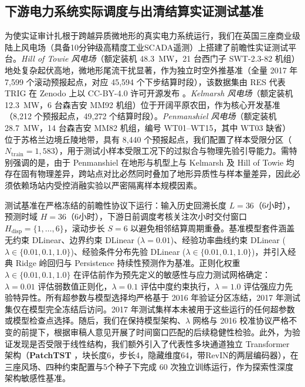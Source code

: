 \subsection{下游电力系统实际调度与出清结算实证测试基准}
为使实证审计扎根于跨越异质微地形的真实电力系统运行，我们在英国三座商业级陆上风电场（具备10分钟级高精度工业SCADA遥测）上搭建了前瞻性实证测试平台。\textit{Hill of Towie 风电场}（额定装机 48.3~MW，21 台西门子 SWT-2.3-82 机组）地处复杂起伏高地，微地形尾流干扰显著，作为独立时空外推基准（全量 2017 年 7,599 个滚动预报起点，对应 45,594 个下步结算时段），该数据集由 RES 代表 TRIG 在 Zenodo 上以 CC-BY-4.0 许可开源发布 \cite{zenodo_hilloftowie}。\textit{Kelmarsh 风电场}（额定装机 12.3~MW，6 台森吉安 MM92 机组）位于开阔平原农田，作为核心开发基准（8,212 个预报起点，49,272 个结算时段）\cite{zenodo_kelmarsh}。\textit{Penmanshiel 风电场}（额定装机 28.7~MW，14 台森吉安 MM82 机组，编号 WT01--WT15，其中 WT03 缺省）\cite{zenodo_penmanshiel} 位于苏格兰边境丘陵地带，具有 8,440 个预报起点，我们配置了样本受限分区（$N_{\text{train}} = 1,583$），用于测试小样本受限工况下的过拟合与物理先验引导能力。需特别强调的是，由于 Penmanshiel 在地形与机型上与 Kelmarsh 及 Hill of Towie 均存在固有物理差异，跨站点对比必然同时叠加了地形异质性与样本量差异，因此必须依赖场站内受控消融实验以严密隔离样本规模因素。

测试基准在严格冻结的前瞻性协议下运行：输入历史回溯长度 $L=36$（6小时），预测时域 $H=36$（6小时），下游日前调度考核关注次小时交付窗口 $H_{\text{disp}} = \{1, \dots, 6\}$，滚动步长 $S=6$ 以避免相邻结算周期重叠。基准模型套件涵盖无约束 DLinear、边界约束 DLinear ($\lambda=0.01$)、经验功率曲线约束 DLinear ($\lambda \in \{0.01, 0.1, 1.0\}$)、经验条件分布先验 DLinear ($\lambda \in \{0.01, 0.1, 1.0\}$)，并引入经典 Ridge 岭回归与 Persistence 持续性预测作为基准。正则化权重 $\lambda \in \{0.01, 0.1, 1.0\}$ 在评估前作为预先定义的敏感性与应力测试网格确定：$\lambda=0.01$ 评估弱数值正则化，$\lambda=0.1$ 评估中度约束执行，$\lambda=1.0$ 评估强应力先验特异性。所有超参数与模型选择均严格基于 2016 年验证分区冻结，2017 年测试集仅在模型完全冻结后访问。2017 年测试集样本未被用于这些运行的任何超参数或模型检查点选择。随后，我们在保持模型架构、$\lambda$ 网格与 2016 校准协议严格不变的前提下，根据审稿人意见开展了时间窗口匹配的后续稳健性检验。此外，为验证发现是否受限于线性结构，我们额外引入了代表性多块通道独立 Transformer 架构（\textbf{PatchTST} \cite{nie2023patchtst}，块长度6，步长4，隐藏维度64，带RevIN的两层编码器），在三座风场、四种约束配置与5个种子下完成 60 次独立训练运行，作为探索性深度架构敏感性基准。

